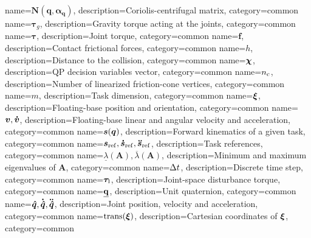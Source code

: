 {
	name={\ensuremath{\mathbf{N}(\bm{q},\boldsymbol{\alpha}_{\bm{q}})}},
	description={Coriolis-centrifugal matrix},
	category={common}
}
{
	name={\ensuremath{\boldsymbol{\tau}_g}},
	description={Gravity torque acting at the joints},
	category={common}
}
{
    name={\ensuremath{\boldsymbol{\tau}}},
    description={Joint torque},
    category={common}
}
{
    name={\ensuremath{\bm{f}}},
    description={Contact frictional forces},
    category={common}
}
{
    name={\ensuremath{h}},
    description={Distance to the collision},
    category={common}
}
{
	name={\ensuremath{\decisionVector}},
	description={QP decision variables vector},
	category={common}
}
{
	name={\ensuremath{n_{\rm c}}},
	description={Number of linearized friction-cone vertices},
	category={common}
}
{
	name={\ensuremath{m}},
	description={Task dimension},
	category={common}
}
{
	name={\ensuremath{\FB}},
	description={Floating-base position and orientation},
	category={common}
}
{
	name={\ensuremath{\FBDot,\FBDDot}},
	description={Floating-base linear and angular velocity and acceleration},
	category={common}
}
{
	name={\ensuremath{\fkin(\genActConf)}},
	description={Forward kinematics of a given task},
	category={common}
}
{
	name={\ensuremath{\fkinRef,\fkinRefDot,\fkinRefDDot}},
	description={Task references},
	category={common}
}
{
	name={\ensuremath{\underline{\lambda}(\mathbf{A}),\overline{\lambda}(\mathbf{A})}},
	description={Minimum and maximum eigenvalues of $\mathbf{A}$},
	category={common}
}
{
	name={\ensuremath{\deltaT}},
	description={Discrete time step},
	category={common}
}
{
	name={\ensuremath{\jointDisturbIn}},
	description={Joint-space disturbance torque},
	category={common} 
}
{
	name={\ensuremath{\quaternion}},
	description={Unit quaternion},
	category={common} 
}
{
	name={\ensuremath{\actConf,\actConfDot,\actConfDDot}},
	description={Joint position, velocity and acceleration},
	category={common} 
}
{
	name={\ensuremath{\trans(\FB)}},
	description={Cartesian coordinates of $\boldsymbol{\xi}$},
	category={common} 
}
